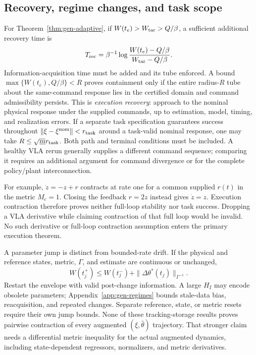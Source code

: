 \subsection{Recovery, regime changes, and task scope}
For Theorem~\ref{thm:gen-adaptive}, if
$W(t_e)>W_{\rm tar}>Q/\beta$, a sufficient additional recovery time is
\begin{equation}
 T_{\rm rec}=\beta^{-1}\log
 \frac{W(t_e)-Q/\beta}{W_{\rm tar}-Q/\beta}.
 \label{eq:gen-time}
\end{equation}
Information-acquisition time must be added and its tube enforced. A bound
$\max\{W(t_e),Q/\beta\}<R$ proves containment only if the entire
radius-$R$ tube about the same-command response lies in the certified
domain and command admissibility persists. This is \emph{execution
recovery}: approach to the nominal physical response under the supplied
commands, up to estimation, model, timing, and realization errors.
If a separate task specification guarantees success throughout
$\|\xi-\xi^{\rm nom}\|<r_{\rm task}$ around a task-valid nominal response, one may
take $R\le\sqrt{\underline m}r_{\rm task}$. Both path and terminal
conditions must be included. A healthy VLA rerun generally supplies a
different command sequence; comparing it requires an additional argument
for command divergence or for the complete policy/plant interconnection.

For example, $\dot z=-z+r$ contracts at rate one for a common supplied
$r(t)$ in the metric $M_c=1$. Closing the feedback $r=2z$ instead gives
$\dot z=z$. Execution contraction therefore proves neither full-loop
stability nor task success. Dropping a VLA derivative while claiming
contraction of that full loop would be invalid. No such derivative or
full-loop contraction assumption enters the primary execution theorem.

A parameter jump is distinct from bounded-rate drift. If the physical and
reference states, metric, $\Gamma$, and estimate are continuous or unchanged,
\begin{equation}
 W(t_j^+)\le W(t_j^-)+\|\Delta\theta^*(t_j)\|_{\Gamma^{-1}}.
 \label{eq:gen-jump}
\end{equation}
Restart the envelope with valid post-change information. A large $H_I$
may encode obsolete parameters; Appendix~\ref{app:gen-regimes} bounds
stale-data bias, reacquisition, and repeated changes. Separate reference,
state, or metric resets require their own jump bounds. None of these
tracking-storage results proves pairwise contraction of every augmented
$(\xi,\hat\theta)$ trajectory. That stronger claim needs a differential
metric inequality for the actual augmented dynamics, including
state-dependent regressors, normalizers, and metric derivatives.
